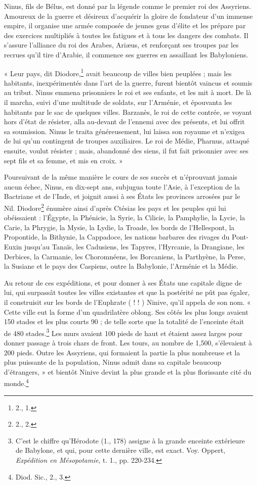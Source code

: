 \documentclass[a4paper, 11pt, oneside, landscape]{article}
\begin{document}
Ninus, fils de Bélus, est donné par la légende comme le premier roi des Assyriens. Amoureux de la guerre et désireux d'acquérir la gloire de fondateur d'un immense empire, il organise une armée composée de jeunes gens d'élite et les prépare par des exercices multipliés à toutes les fatigues et à tous les dangers des combats. Il s'assure l'alliance du roi des Arabes, Ariæus, et renforçant ses troupes par les recrues qu'il tire d'Arabie, il commence ses guerres en assaillant les Babyloniens.

« Leur pays, dit Diodore,\footnote{2., 1.} avait beaucoup de villes bien peuplées ; mais les habitants, inexpérimentés dans l'art de la guerre, furent bientôt vaincus et soumis au tribut. Ninus emmena prisonniers le roi et ses enfants, et les mit à mort. De là il marcha, suivi d'une multitude de soldats, sur l'Arménie, et épouvanta les habitants par le sac de quelques villes. Barzanès, le roi de cette contrée, se voyant hors d'état de résister, alla au-devant de l'ennemi avec des présents, et lui offrit sa soumission. Ninus le traita généreusement, lui laissa son royaume et n'exigea de lui qu'un contingent de troupes auxiliaires. Le roi de Médie, Pharnus, attaqué ensuite, voulut résister ; mais, abandonné des siens, il fut fait prisonnier avec ses sept fils et sa femme, et mis en croix. »

Poursuivant de la même manière le cours de ses succès et n'éprouvant jamais aucun échec, Ninus, en dix-sept ans, subjugua toute l'Asie, à l'exception de la Bactriane et de l'Inde, et joignit aussi à ses États les provinces arrosées par le Nil. Diodore\footnote{2., 2.} énumère ainsi d'après Ctésias les pays et les peuples qui lui obéissaient : l'Égypte, la Phénicie, la Syrie, la Cilicie, la Pamphylie, la Lycie, la Carie, la Phrygie, la Mysie, la Lydie, la Troade, les bords de l'Hellespont, la Propontide, la Bithynie, la Cappadoce, les nations barbares des rivages du Pont-Euxin jusqu'au Tanaïs, les Cadusiens, les Tapyres, l'Hyrcanie, la Drangiane, les Derbices, la Carmanie, les Choromnéens, les Borcaniens, la Parthyène, la Perse, la Susiane et le pays des Caspiens, outre la Babylonie, l'Arménie et la Médie.

Au retour de ces expéditions, et pour donner à ses États une capitale digne de lui, qui surpassât toutes les villes existantes et que la postérité ne pût pas égaler, il construisit sur les bords de l'Euphrate ( ! ! ) Ninive, qu'il appela de son nom. « Cette ville eut la forme d'un quadrilatère oblong. Ses côtés les plus longs avaient 150 stades et les plus courts 90 ; de telle sorte que la totalité de l'enceinte était de 480 stades.\footnote{C'est le chiffre qu'Hérodote (1., 178) assigne à la grande enceinte extérieure de Babylone, et qui, pour cette dernière ville, est exact. Voy. Oppert, \emph{Expédition en Mésopotamie}, t. 1., pp. 220-234.} Les murs avaient 100 pieds de haut et étaient assez larges pour donner passage à trois chars de front. Les tours, au nombre de 1,500, s'élevaient à 200 pieds. Outre les Assyriens, qui formaient la partie la plus nombreuse et la plus puissante de la population, Ninus admit dans sa capitale beaucoup d'étrangers, » et bientôt Ninive devint la plus grande et la plus florissante cité du monde.\footnote{Diod. Sic., 2., 3.}
\end{document}
